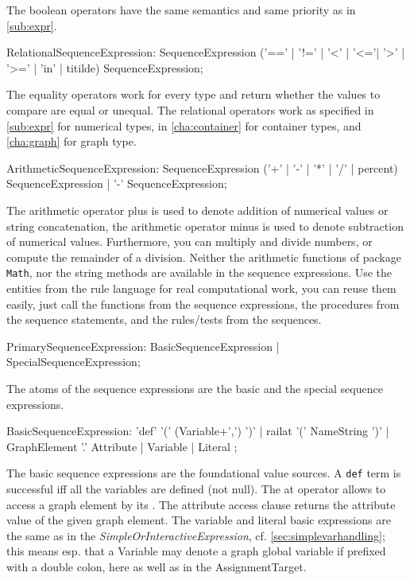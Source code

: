 The boolean operators have the same semantics and same priority as in \ref{sub:expr}.

\begin{rail}
  RelationalSequenceExpression: 
    SequenceExpression ('==' | '!=' | '<' | '<='| '>' | '>=' | 'in' | titilde) SequenceExpression;
\end{rail}

The equality operators work for every type and return whether the values to compare are equal or unequal.
The relational operators work as specified in \ref{sub:expr} for numerical types, in \ref{cha:container} for container types, and \ref{cha:graph} for graph type.

\begin{rail}
  ArithmeticSequenceExpression:
    SequenceExpression ('+' | '-' | '*' | '/' | percent) SequenceExpression |
		'-' SequenceExpression;
\end{rail}

The arithmetic operator plus is used to denote addition of numerical values or string concatenation,
the arithmetic operator minus is used to denote subtraction of numerical values.
Furthermore, you can multiply and divide numbers, or compute the remainder of a division.
Neither the arithmetic functions of package \texttt{Math}, nor the string methods are available in the sequence expressions.
Use the entities from the rule language for real computational work, you can reuse them easily, just call the functions from the sequence expressions, the procedures from the sequence statements, and the rules/tests from the sequences.

\begin{rail}
  PrimarySequenceExpression:
    BasicSequenceExpression |
    SpecialSequenceExpression;
\end{rail}

The atoms of the sequence expressions are the basic and the special sequence expressions.

\begin{rail}
  BasicSequenceExpression:
    'def' '(' (Variable+',') ')' |
	  railat '(' NameString ')' |
 	  GraphElement '.' Attribute |
	  Variable | 
    Literal
  ;
\end{rail}

The basic sequence expressions are the foundational value sources.
A \texttt{def} term is successful iff all the variables are defined (not null).
The at operator allows to access a graph element by its .
The attribute access clause returns the attribute value of the given graph element.
The variable and literal basic expressions are the same as in the \emph{SimpleOrInteractiveExpression}, cf. \ref{sec:simplevarhandling};
this means esp. that a Variable may denote a graph global variable if prefixed with a double colon, here as well as in the AssignmentTarget.

